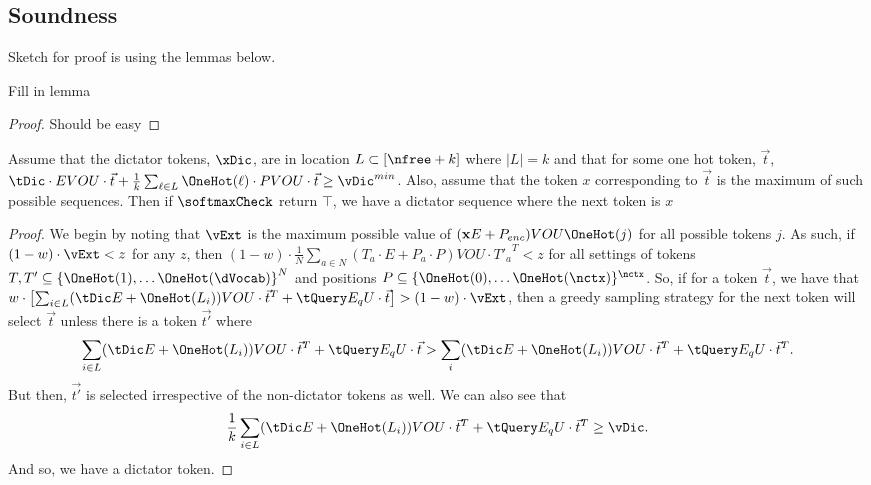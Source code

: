 \subsection{Soundness}

Sketch for proof is using the lemmas below.

\begin{lemma}
    Fill in lemma
\end{lemma}
\begin{proof}
    Should be easy 
\end{proof}

\begin{lemma}
	Assume that the dictator tokens, $\xDic$, are in location $L \subset [\nfree + k]$ where $|L| = k$ and that for some one hot token, $\vec{t}$, $\tDic \cdot EVOU \cdot \vec{t} + \frac{1}{k} \sum_{\ell \in L} \OneHot(\ell) \cdot PVOU \cdot \vec{t} \geq \vDic^{min}$.
	Also, assume that the token $x$ corresponding to $\vec{t}$ is the maximum of such possible sequences.
	Then if $\softmaxCheck$ return $\top$, we have a dictator sequence where the next token is $x$
\end{lemma}
\begin{proof}
	We begin by noting that	$\vExt$ is the maximum possible value of $(\mathbf{x}E + P_{enc}) VOU \OneHot(j)$ for all possible tokens $j$.
	As such, if $(1 - w) \cdot \vExt < z$ for any $z$, then $(1 - w) \cdot \frac{1}{N} \sum_{a \in N} (T_a \cdot E + P_a \cdot P) VOU \cdot {T'_a}^T < z$ for all settings of tokens $T, T' \subseteq {\{\OneHot(1), \dots \OneHot(\dVocab)\}}^N$ and positions $P \subseteq \{\OneHot(0), \dots \OneHot(\nctx)\}^\nctx$.
	So, if for a token $\vec{t}$, we have that $w \cdot \left[\sum_{i \in L} (\tDic E + \OneHot(L_i)) VOU \cdot \vec{t}^T + \tQuery E_q U \cdot \vec{t} \right] > (1 - w) \cdot \vExt$, then a greedy sampling strategy for the next token will select $\vec{t}$ unless there is a token $\vec{t'}$ where 
	\[
		 \sum_{i \in L} (\tDic E + \OneHot(L_i)) VOU \cdot \vec{t}^T + \tQuery E_q U \cdot \vec{t} > \sum_i (\tDic E + \OneHot(L_i)) VOU \cdot \vec{t}^T + \tQuery E_q U \cdot \vec{t}^T.
	\]
	But then, $\vec{t'}$ is selected irrespective of the non-dictator tokens as well.
	We can also see that 
	\[
		\frac{1}{k} \sum_{i \in L} (\tDic E + \OneHot(L_i)) VOU \cdot \vec{t}^T + \tQuery E_q U \cdot \vec{t}^T \geq \vDic.
	\]
	And so, we have a dictator token.

\end{proof}

